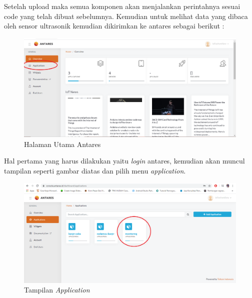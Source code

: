 \begin{enumerate}
    \par Setelah upload maka semua komponen akan menjalankan perintahnya sesuai code yang telah dibuat sebelumnya. Kemudian untuk melihat data yang dibaca oleh sensor ultrasonik kemudian dikirimkan ke antares sebagai berikut :
      \begin{figure}[H]
    \centering
    \includegraphics[width=1\textwidth]{figures/project1.png}
    \caption{Halaman Utama Antares }
    \label{print}
    \end{figure}
    \par Hal pertama yang harus dilakukan yaitu \textit{login} antares, kemudian akan muncul tampilan seperti gambar diatas dan pilih menu \textit{application}.
      \begin{figure}[H]
    \centering
    \includegraphics[width=1\textwidth]{figures/data.png}
    \caption{Tampilan \textit{Application}}
    \label{print}
    \end{figure}
     

\end{enumerate}
